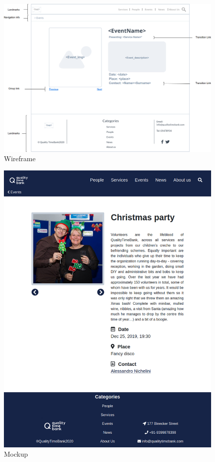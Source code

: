 \documentclass[a4paper, 11pt, parskip=half, headsepline]{scrreprt}
\begin{document}
\begin{figure}[H]
    \centering
    \includegraphics[width=1\linewidth, keepaspectratio]{wireframes/KindOfTopic-Event}
    \caption{Wireframe}
\end{figure}

\begin{figure}[H]
    \centering
    \includegraphics[width=1\linewidth, keepaspectratio]{mockups/ConcreteEventChristmas}
    \caption{Mockup}
\end{figure}
\end{document}
